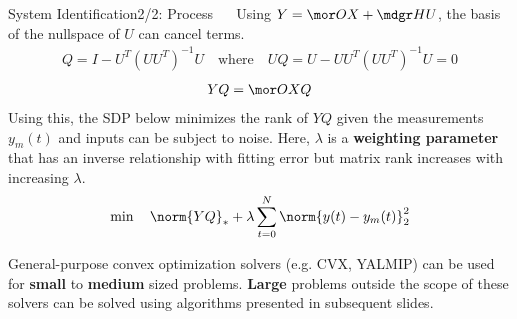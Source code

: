 \begin{frame}{System Identification}{2/2: Process \ \  \cite{vandenberghe2012convex,Ljung1986System}}
Using \(Y = {\mor O}X + {\mdgr H}U\), the basis of the nullspace of $U$ can cancel terms.
\begin{align*}
    Q = I - U^T(UU^T)^{-1}U \quad \text{where} \quad UQ = U - UU^T(UU^T)^{-1}U = 0
\end{align*}
\begin{align*}
    YQ = {\mor O}XQ
\end{align*}
Using this, the SDP below minimizes the rank of $YQ$ given the measurements $y_m(t)$ and inputs can be subject to noise. Here, $\lambda$ is a \textbf{weighting parameter} that has an inverse relationship with fitting error but matrix rank increases with increasing $\lambda$.
\begin{align*}
    \min \quad \norm{YQ}_* +\lambda\sum_{t=0}^{N}\norm{y(t) - y_m(t)}_2^2
\end{align*}

General-purpose convex optimization solvers (e.g. CVX, YALMIP) can be used for \textbf{small} to \textbf{medium} sized problems. \textbf{Large} problems outside the scope of these solvers can be solved using algorithms presented in subsequent slides.
\end{frame}

